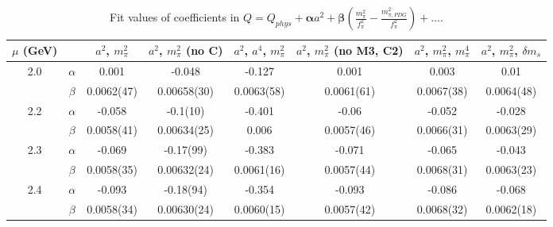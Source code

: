 \documentclass[12pt]{extarticle}
\begin{document}
\begin{table}[h!]
\begin{center}
\begin{tabular}{|c c|c|c|c|c|c|c|}
\hline
$\mu$ (GeV) &  & $a^2$, $m_\pi^2$& $a^2$, $m_\pi^2$ (no C)& $a^2$, $a^4$, $m_\pi^2$& $a^2$, $m_\pi^2$ (no M3, C2)& $a^2$, $m_\pi^2$, $m_\pi^4$& $a^2$, $m_\pi^2$, $\delta m_s$\\
\hline
\multirow{2}{0.5in}{2.0} & $\alpha$ & 0.001& -0.048& -0.127& 0.001& 0.003& 0.01\\
 & $\beta$ & 0.0062(47)& 0.00658(30)& 0.0063(58)& 0.0061(61)& 0.0067(38)& 0.0064(48)\\
\hline
\multirow{2}{0.5in}{2.2} & $\alpha$ & -0.058& -0.1(10)& -0.401& -0.06& -0.052& -0.028\\
 & $\beta$ & 0.0058(41)& 0.00634(25)& 0.006& 0.0057(46)& 0.0066(31)& 0.0063(29)\\
\hline
\multirow{2}{0.5in}{2.3} & $\alpha$ & -0.069& -0.17(99)& -0.383& -0.071& -0.065& -0.043\\
 & $\beta$ & 0.0058(35)& 0.00632(24)& 0.0061(16)& 0.0057(44)& 0.0068(31)& 0.0063(23)\\
\hline
\multirow{2}{0.5in}{2.4} & $\alpha$ & -0.093& -0.18(94)& -0.354& -0.093& -0.086& -0.068\\
 & $\beta$ & 0.0058(34)& 0.00630(24)& 0.0060(15)& 0.0057(42)& 0.0068(32)& 0.0062(18)\\
\hline
\end{tabular}
\caption{Fit values of coefficients in $Q = Q_{phys} + \mathbf{\alpha} a^2 + \mathbf{\beta}\left(\frac{m_\pi^2}{f_\pi^2}-\frac{m_{\pi,PDG}^2}{f_\pi^2}\right) + \ldots$.}
\end{center}
\end{table}
























\clearpage
\end{document}
